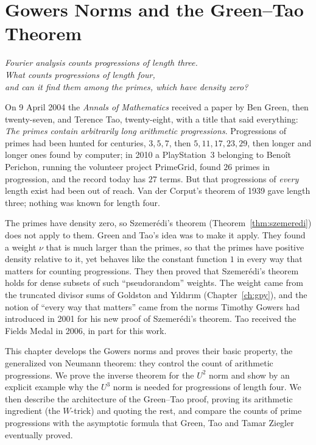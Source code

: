\chapter{Gowers Norms and the Green--Tao Theorem}\label{ch:gowers}
\begin{center}\itshape
Fourier analysis counts progressions of length three.\\
What counts progressions of length four,\\
and can it find them among the primes, which have density zero?
\end{center}

On 9 April 2004 the \emph{Annals of Mathematics} received a paper by Ben Green, then twenty-seven, and Terence Tao, twenty-eight, with a title that said everything: \emph{The primes contain arbitrarily long arithmetic progressions}. Progressions of primes had been hunted for centuries, $3,5,7$, then $5,11,17,23,29$, then longer and longer ones found by computer; in 2010 a PlayStation~3 belonging to Benoît Perichon, running the volunteer project PrimeGrid, found $26$ primes in progression, and the record today has $27$ terms. But that progressions of \emph{every} length exist had been out of reach. Van der Corput's theorem of 1939 gave length three; nothing was known for length four.

The primes have density zero, so Szemerédi's theorem (Theorem~\ref{thm:szemeredi}) does not apply to them. Green and Tao's idea was to make it apply. They found a weight $\nu$ that is much larger than the primes, so that the primes have positive density relative to it, yet behaves like the constant function $1$ in every way that matters for counting progressions. They then proved that Szemerédi's theorem holds for dense subsets of such ``pseudorandom'' weights. The weight came from the truncated divisor sums of Goldston and Yıldırım (Chapter~\ref{ch:gpy}), and the notion of ``every way that matters'' came from the norms Timothy Gowers had introduced in 2001 for his new proof of Szemerédi's theorem. Tao received the Fields Medal in 2006, in part for this work.

This chapter develops the Gowers norms and proves their basic property, the generalized von Neumann theorem: they control the count of arithmetic progressions. We prove the inverse theorem for the $U^2$ norm and show by an explicit example why the $U^3$ norm is needed for progressions of length four. We then describe the architecture of the Green--Tao proof, proving its arithmetic ingredient (the $W$-trick) and quoting the rest, and compare the counts of prime progressions with the asymptotic formula that Green, Tao and Tamar Ziegler eventually proved.

